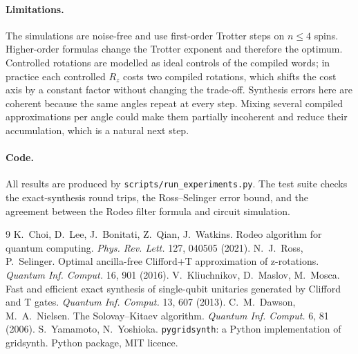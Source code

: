 \documentclass[10pt,a4paper]{article}
\begin{document}
\paragraph{Limitations.} The simulations are noise-free and use first-order Trotter steps on $n\le4$ spins. Higher-order formulas change the Trotter exponent and therefore the optimum. Controlled rotations are modelled as ideal controls of the compiled words; in practice each controlled $R_z$ costs two compiled rotations, which shifts the cost axis by a constant factor without changing the trade-off. Synthesis errors here are coherent because the same angles repeat at every step. Mixing several compiled approximations per angle could make them partially incoherent and reduce their accumulation, which is a natural next step.

\paragraph{Code.} All results are produced by \texttt{scripts/run\_experiments.py}. The test suite checks the exact-synthesis round trips, the Ross--Selinger error bound, and the agreement between the Rodeo filter formula and circuit simulation.

\begin{thebibliography}{9}\small
{} K.~Choi, D.~Lee, J.~Bonitati, Z.~Qian, J.~Watkins. Rodeo algorithm for quantum computing. \textit{Phys. Rev. Lett.} 127, 040505 (2021).
 N.~J.~Ross, P.~Selinger. Optimal ancilla-free Clifford+T approximation of z-rotations. \textit{Quantum Inf. Comput.} 16, 901 (2016).
 V.~Kliuchnikov, D.~Maslov, M.~Mosca. Fast and efficient exact synthesis of single-qubit unitaries generated by Clifford and T gates. \textit{Quantum Inf. Comput.} 13, 607 (2013).
 C.~M.~Dawson, M.~A.~Nielsen. The Solovay--Kitaev algorithm. \textit{Quantum Inf. Comput.} 6, 81 (2006).
 S.~Yamamoto, N.~Yoshioka. \texttt{pygridsynth}: a Python implementation of gridsynth. Python package, MIT licence.
\end{thebibliography}
\end{document}
